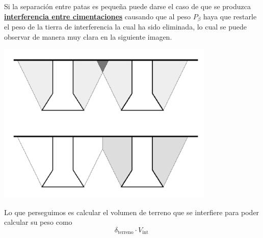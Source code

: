 \documentclass{article}
\begin{document}
\begin{itemize}
\begin{itemize}
\begin{center}
                        \end{center}
                    \end{itemize}
                Si la separación entre patas es pequeña puede darse el caso de que se produzca \textbf{\underline{interferencia entre cimentaciones}} causando que al peso $P_\beta$ haya que restarle el peso de la tierra de interferencia la cual ha sido eliminada, lo cual se puede observar de manera muy clara en la siguiente imagen.
                \begin{center}
                     \includegraphics[scale = 0.5]{assets/img/Patas Separadas/interferencia entre cimentaciones.png}
                \end{center}
                Lo que perseguimos es calcular el volumen de terreno que se interfiere para poder calcular su peso como 
                \begin{equation*}
                \delta_{\text {terreno}} \cdot V_{\text {int }}
                \end{equation*}
                \\
                

\end{itemize}
\end{document}
